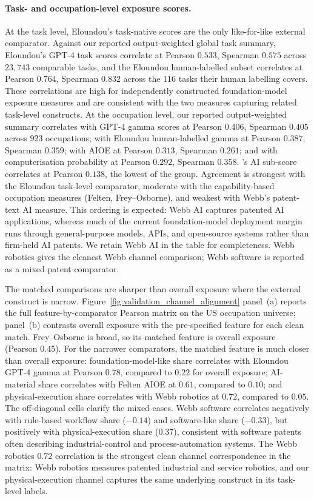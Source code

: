 \documentclass[11pt]{article}
\begin{document}
\paragraph{Task- and occupation-level exposure scores.} At the task level, Eloundou's task-native scores are the only like-for-like external comparator. Against our reported output-weighted global task summary, Eloundou's GPT-4 task scores correlate at Pearson $0.533$, Spearman $0.575$ across $23{,}743$ comparable tasks, and the Eloundou human-labelled subset correlates at Pearson $0.764$, Spearman $0.832$ across the $116$ tasks their human labelling covers. These correlations are high for independently constructed foundation-model exposure measures and are consistent with the two measures capturing related task-level constructs. At the occupation level, our reported output-weighted summary correlates with \citet{EloundouEtAl2024} GPT-4 gamma scores at Pearson $0.406$, Spearman $0.405$ across $923$ occupations; with Eloundou human-labelled gamma at Pearson $0.387$, Spearman $0.359$; with \citet{felten2021occupational} AIOE at Pearson $0.313$, Spearman $0.261$; and with \citet{frey2017future} computerisation probability at Pearson $0.292$, Spearman $0.358$. \citet{Webb2020}'s AI sub-score correlates at Pearson $0.138$, the lowest of the group. Agreement is strongest with the Eloundou task-level comparator, moderate with the capability-based occupation measures (Felten, Frey--Osborne), and weakest with Webb's patent-text AI measure. This ordering is expected: Webb AI captures patented AI applications, whereas much of the current foundation-model deployment margin runs through general-purpose models, APIs, and open-source systems rather than firm-held AI patents. We retain Webb AI in the table for completeness. Webb robotics gives the cleanest Webb channel comparison; Webb software is reported as a mixed patent comparator.

The matched comparisons are sharper than overall exposure where the external construct is narrow. Figure~\ref{fig:validation_channel_alignment} panel~(a) reports the full feature-by-comparator Pearson matrix on the US occupation universe; panel~(b) contrasts overall exposure with the pre-specified feature for each clean match. Frey--Osborne is broad, so its matched feature is overall exposure (Pearson $0.45$). For the narrower comparators, the matched feature is much closer than overall exposure: foundation-model-like share correlates with Eloundou GPT-4 gamma at Pearson $0.78$, compared to $0.22$ for overall exposure; AI-material share correlates with Felten AIOE at $0.61$, compared to $0.10$; and physical-execution share correlates with Webb robotics at $0.72$, compared to $0.05$. The off-diagonal cells clarify the mixed cases. Webb software correlates negatively with rule-based workflow share ($-0.14$) and software-like share ($-0.33$), but positively with physical-execution share ($0.37$), consistent with software patents often describing industrial-control and process-automation systems. The Webb robotics $0.72$ correlation is the strongest clean channel correspondence in the matrix: Webb robotics measures patented industrial and service robotics, and our physical-execution channel captures the same underlying construct in its task-level labels.
\end{document}
